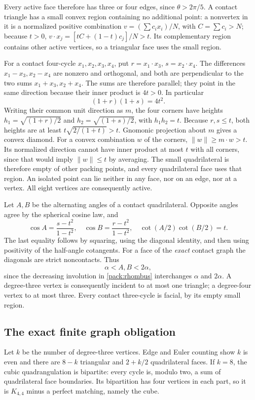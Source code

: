 \documentclass[12pt,reqno]{amsart}
\theoremstyle{definition}
\newcommand{\norm}[1]{\lVert#1\rVert}
\numberwithin{equation}{section}
\begin{document}
Every active face therefore has three or four edges, since
$\theta>2\pi/5$. A contact triangle has a small convex region containing
no additional point: a nonvertex in it is a normalized positive combination
$v=(\sum c_i x_i)/N$, with $C=\sum c_i>N$; because $t>0$,
$v\cdot x_j=[tC+(1-t)c_j]/N>t$. Its complementary region contains other
active vertices, so a triangular face uses the small region.

For a contact four-cycle $x_1,x_2,x_3,x_4$, put
$r=x_1\cdot x_3$, $s=x_2\cdot x_4$. The differences
$x_1-x_3,x_2-x_4$ are nonzero and orthogonal, and both are perpendicular
to the two sums $x_1+x_3,x_2+x_4$. The sums are therefore parallel; they
point in the same direction because their inner product is $4t>0$.
In particular
\[
 (1+r)(1+s)=4t^2.
\]
Writing their common unit direction as $m$, the four corners have heights
$h_1=\sqrt{(1+r)/2}$ and $h_2=\sqrt{(1+s)/2}$, with $h_1h_2=t$.
Because $r,s\le t$, both heights are at least
$t\sqrt{2/(1+t)}>t$. Gnomonic projection about $m$ gives a convex diamond.
For a convex combination $w$ of the corners, $\norm w\ge m\cdot w>t$.
Its normalized direction cannot have inner product at most $t$ with all
corners, since that would imply $\norm w\le t$ by averaging.
The small quadrilateral is therefore empty of other packing points,
and every quadrilateral face uses that region. An isolated point can
lie neither in any face, nor on an edge, nor at a vertex. All eight
vertices are consequently active.

Let $A,B$ be the alternating angles of a contact quadrilateral. Opposite
angles agree by the spherical cosine law, and
\begin{equation}\label{pack:rhombus}
 \cos A=\frac{s-t^2}{1-t^2},\quad
 \cos B=\frac{r-t^2}{1-t^2},\quad
 \cot(A/2)\cot(B/2)=t.
\end{equation}
The last equality follows by squaring, using the diagonal identity, and
then using positivity of the half-angle cotangents. For a face of the
\emph{exact} contact graph the diagonals are strict noncontacts. Thus
\begin{equation}\label{pack:angles}
 \alpha<A,B<2\alpha,
\end{equation}
since the decreasing involution in \eqref{pack:rhombus} interchanges $\alpha$ and
$2\alpha$. A degree-three vertex is consequently incident to at most
one triangle; a degree-four vertex to at most three. Every contact
three-cycle is facial, by its empty small region.

\subsection{The exact finite graph obligation}
Let $k$ be the number of degree-three vertices. Edge and Euler counting
show $k$ is even and there are $8-k$ triangular and $2+k/2$
quadrilateral faces. If $k=8$, the cubic quadrangulation is bipartite:
every cycle is, modulo two, a sum of quadrilateral face boundaries.
Its bipartition has four vertices in each part, so it is $K_{4,4}$ minus
a perfect matching, namely the cube.
\end{document}
